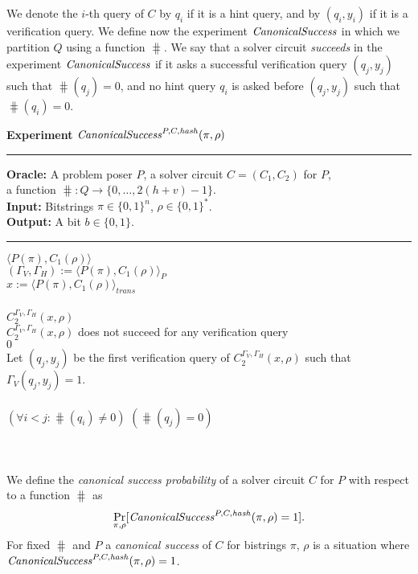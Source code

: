 We denote the $i$-th query of $C$ by $q_i$ if it is a hint query, and by $(q_i, y_i)$ if it is a verification query.
We define now the experiment $\operatorname{\mathit{CanonicalSuccess}}$ in which we partition $Q$ using a function $\hash$.
We say that a solver circuit \textit{succeeds} in the experiment $\operatorname{\mathit{CanonicalSuccess}}$
if it asks a successful verification query $(q_j, y_j)$ such that $\hash(q_j) = 0$,
and no hint query $q_i$ is asked before $(q_j, y_j)$ such that $\hash(q_i) = 0$.
%
\begin{codeblock}
  \textbf{Experiment} $\operatorname{\mathit{CanonicalSuccess}}^{P, C, \operatorname{\mathit{hash}}}(\pi, \rho)$
  \medskip \hrule \medskip
  \textbf{Oracle:} A problem poser $P$, a solver circuit $C = (C_1, C_2)$ for $P$,\\
  \IndII a function $\hash: Q \rightarrow \{0, \dots, 2(h+v) - 1\}$.\\
  \textbf{Input:}  Bitstrings $\pi \in \{0,1\}^n$, $\rho \in \{0,1\}^*$. \\
  \textbf{Output:} A bit $b \in \{0,1\}$.

  \medskip\hrule\medskip
  \Run $\langle P(\pi), C_1(\rho) \rangle$ \\
  \IndI $(\Gamma_V, \Gamma_H) := \langle P(\pi), C_1(\rho) \rangle_{P}$ \\
  \IndI $x := \langle P(\pi), C_1(\rho) \rangle_{\mathit{trans}}$ \\ \\
  \Run $C_2^{\Gamma_V, \Gamma_H} (x, \rho)$ \\
  \IndI \If $C_2^{\Gamma_V, \Gamma_H} (x, \rho)$ does not succeed for any verification query \Then \\
  \IndII \Return $0$ \\
  \IndI Let $(q_j,y_j)$ be the first verification query of $C_2^{\Gamma_V, \Gamma_H} (x, \rho)$ such that $\Gamma_V(q_j, y_j) = 1$.\\
  \\
  \If $(\forall i < j :  \hash(q_i) \neq 0)$ \And $(\hash(q_j) = 0)$ \Then \\
  \IndI {}\\
  \Else\\
  \IndI {}
\end{codeblock}
%
We define the \textit{canonical success probability} of a solver circuit $C$ for $P$ with respect to a function $\hash$ as
\begin{align}
 \underset{\pi, \rho}{\Pr}[\operatorname{\mathit{CanonicalSuccess}}^{P, C, \operatorname{\mathit{hash}}}(\pi, \rho) = 1].
\end{align}
%
For fixed $\hash$ and $P$ a \textit{canonical success} of $C$ for bistrings $\pi$, $\rho$ is a situation where \linebreak
$\operatorname{\mathit{CanonicalSuccess}}^{P, C, \operatorname{\mathit{hash}}}(\pi, \rho) = 1$.

